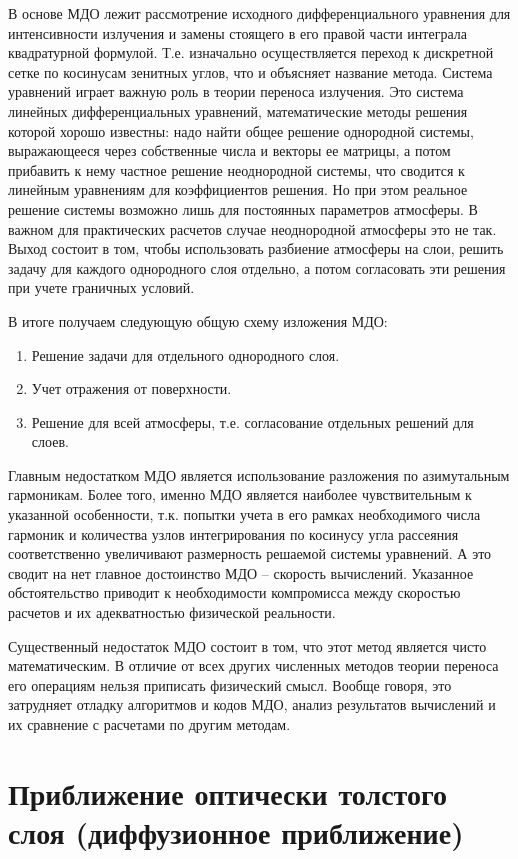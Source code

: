 В основе МДО лежит рассмотрение исходного дифференциального уравнения для интенсивности излучения и замены стоящего в его правой части интеграла квадратурной формулой. Т.е. изначально осуществляется переход к дискретной сетке по косинусам зенитных углов, что и объясняет название метода. Система уравнений играет важную роль в теории переноса излучения. Это система линейных дифференциальных уравнений, математические методы решения которой хорошо известны: надо найти общее решение однородной системы, выражающееся через собственные числа и векторы ее матрицы, а потом прибавить к нему частное решение неоднородной системы, что сводится к линейным уравнениям для коэффициентов решения. Но при этом реальное решение системы возможно лишь для постоянных параметров атмосферы. В важном для практических расчетов случае неоднородной атмосферы это не так. Выход состоит в том, чтобы использовать разбиение атмосферы на слои, решить задачу для каждого однородного слоя отдельно, а потом согласовать эти решения при учете граничных условий. 

В итоге получаем следующую общую схему изложения МДО: 
\begin{enumerate}
    \item Решение задачи для отдельного однородного слоя.
    \item Учет отражения от поверхности.
    \item Решение для всей атмосферы, т.е. согласование отдельных решений для слоев. 
\end{enumerate}

Главным недостатком МДО является использование разложения по азимутальным гармоникам. Более того, именно МДО является наиболее чувствительным к указанной особенности, т.к. попытки учета в его рамках необходимого числа гармоник и количества узлов интегрирования по косинусу угла рассеяния соответственно увеличивают размерность решаемой системы уравнений. А это сводит на нет главное достоинство МДО – скорость вычислений. Указанное обстоятельство приводит к необходимости компромисса между скоростью расчетов и их адекватностью физической реальности. 

Существенный недостаток МДО состоит в том, что этот метод является чисто математическим. В отличие от всех других численных методов теории переноса его операциям нельзя приписать физический смысл. Вообще говоря, это затрудняет отладку алгоритмов и кодов МДО, анализ результатов вычислений и их сравнение с расчетами по другим методам. 

\section{Приближение оптически толстого слоя (диффузионное приближение)}

